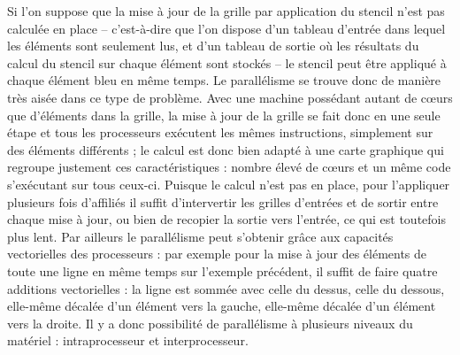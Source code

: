 Si l'on suppose que la mise à jour de la grille par application du stencil n'est pas calculée en place -- c'est-à-dire que l'on dispose d'un tableau d'entrée dans lequel les éléments sont seulement lus, et d'un tableau de sortie où les résultats du calcul du stencil sur chaque élément sont stockés -- le stencil peut être appliqué à chaque élément bleu en même temps. Le parallélisme se trouve donc de manière très aisée dans ce type de problème. Avec une  machine possédant autant de cœurs que d'éléments dans la grille, la mise à jour de la grille se fait donc en une seule étape et tous les processeurs exécutent les mêmes instructions, simplement sur des éléments différents ; le calcul est donc bien adapté à une carte graphique qui regroupe justement ces caractéristiques : nombre élevé de cœurs et un même code s'exécutant sur tous ceux-ci. Puisque le calcul n'est pas en place, pour l'appliquer plusieurs fois d'affiliés il suffit d'intervertir les grilles d'entrées et de sortir entre chaque mise à jour, ou bien de recopier la sortie vers l'entrée, ce qui est toutefois plus lent. Par ailleurs le parallélisme peut s'obtenir grâce aux capacités vectorielles des processeurs : par exemple pour la mise à jour des éléments de toute une ligne en même temps sur l'exemple précédent, il suffit de faire quatre additions vectorielles : la ligne est sommée avec celle du dessus, celle du dessous, elle-même décalée d'un élément vers la gauche, elle-même décalée d'un élément vers la droite. Il y a donc possibilité de parallélisme à plusieurs niveaux du matériel : intraprocesseur et interprocesseur.

